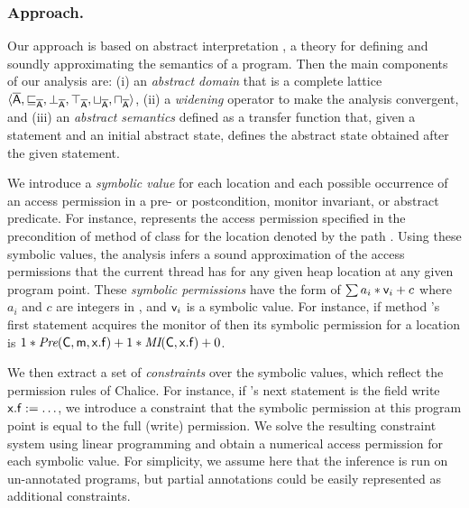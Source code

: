 \documentclass{llncs}
\begin{document}
\goup
\goup
\subsubsection{Approach.}


Our approach is based on abstract interpretation \cite{CC77,CC79}, a
theory for defining and soundly approximating the semantics of a
program. Then the main components of our analysis are: (i) an \emph{abstract domain} that is a complete
lattice $\langle \mathsf{\overline{A}}, \sqsubseteq_{\mathsf{\overline{A}}}, \bot_{\mathsf{\overline{A}}},
\top_{\mathsf{\overline{A}}}, \sqcup_{\mathsf{\overline{A}}}, \sqcap_{\mathsf{\overline{A}}} \rangle$, (ii) a
\emph{widening} operator to make  the analysis convergent, and (iii) an
\emph{abstract semantics} defined as a transfer function that, given a
statement and an initial abstract state, defines the abstract state
obtained after the given statement.

We introduce a \emph{symbolic value} for each location and each
possible occurrence of an access permission in a
pre- or postcondition, monitor invariant, or abstract
predicate.  For instance,  represents the access
permission specified in the precondition of method  of
class  for the location denoted by the path
.  Using these symbolic values, the analysis infers a
sound approximation of the access permissions that the current thread
has for any given heap location at any given program
point. These \emph{symbolic permissions} have the form of $\sum a_i *
\mathsf{v}_i + c$ where $a_i$ and $c$ are integers in
\integernumbers, and $\mathsf{v}_i$ is a symbolic value. For
instance, if method 's first statement acquires the
monitor of  then its symbolic permission 
for a location  is $1 * \textit{Pre}(\mathsf{C}, \mathsf{m}, \mathsf{x.f}) + 1 *
\textit{MI}(\mathsf{C}, \mathsf{x.f}) + 0$.

We then extract a set of \emph{constraints} over the symbolic values,
which reflect the permission rules of Chalice. For instance, if
's next statement is the field write
$\mathsf{x.f}:=\ldots$, we introduce a constraint that the symbolic
permission  at this program point is equal to the full (write)
permission. We solve the resulting constraint system using linear
programming and obtain a numerical access permission for each symbolic
value. For simplicity, we assume here that the inference is run on
un-annotated programs, but partial annotations could be easily represented as additional constraints.
\end{document}
